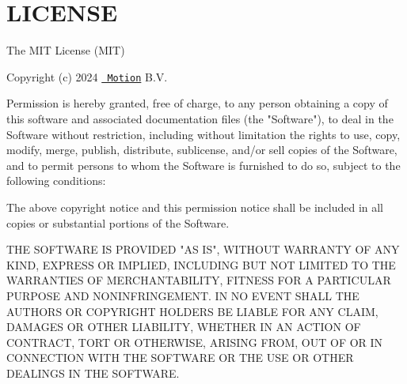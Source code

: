 \chapter{LICENSE}
\hypertarget{md_node__modules_2motion-utils_2_l_i_c_e_n_s_e}{}\label{md_node__modules_2motion-utils_2_l_i_c_e_n_s_e}
The MIT License (MIT)

Copyright (c) 2024 \href{https://motion.dev}{\texttt{ Motion}} B.\+V.

Permission is hereby granted, free of charge, to any person obtaining a copy of this software and associated documentation files (the "{}\+Software"{}), to deal in the Software without restriction, including without limitation the rights to use, copy, modify, merge, publish, distribute, sublicense, and/or sell copies of the Software, and to permit persons to whom the Software is furnished to do so, subject to the following conditions\+:

The above copyright notice and this permission notice shall be included in all copies or substantial portions of the Software.

THE SOFTWARE IS PROVIDED "{}\+AS IS"{}, WITHOUT WARRANTY OF ANY KIND, EXPRESS OR IMPLIED, INCLUDING BUT NOT LIMITED TO THE WARRANTIES OF MERCHANTABILITY, FITNESS FOR A PARTICULAR PURPOSE AND NONINFRINGEMENT. IN NO EVENT SHALL THE AUTHORS OR COPYRIGHT HOLDERS BE LIABLE FOR ANY CLAIM, DAMAGES OR OTHER LIABILITY, WHETHER IN AN ACTION OF CONTRACT, TORT OR OTHERWISE, ARISING FROM, OUT OF OR IN CONNECTION WITH THE SOFTWARE OR THE USE OR OTHER DEALINGS IN THE SOFTWARE. 